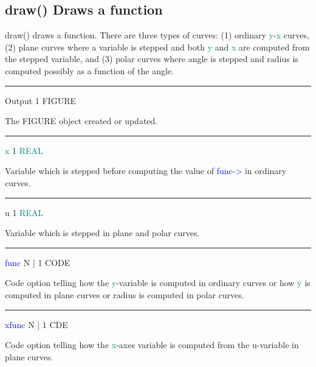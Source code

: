 \subsection{\textcolor{VioletRed}{draw}() Draws a function} 
\label{draw} 
\textcolor{VioletRed}{draw}() draws a function. There are three types of curves: (1) ordinary \textcolor{teal}{y}-\textcolor{teal}{x} curves, (2) plane 
curves where a variable is stepped and both \textcolor{teal}{y} and \textcolor{teal}{x} are computed from the stepped variable, and (3) 
polar curves where angle is stepped and radius is computed possibly as a function of the angle. 
\vspace{0.3cm} 
\hrule 
\vspace{0.3cm} 
\noindent Output  \tabto{3cm}  1 \tabto{5cm}   FIGURE  \tabto{7cm} 
\begin{changemargin}{3cm}{0cm} 
\noindent  The FIGURE object created or updated. 
\end{changemargin} 
\vspace{0.3cm} 
\hrule 
\vspace{0.3cm} 
\noindent \textcolor{teal}{x} \tabto{3cm} 1 \tabto{5cm}  \textcolor{teal}{REAL} \tabto{7cm} 
\begin{changemargin}{3cm}{0cm} 
\noindent Variable which is stepped before computing the value of \textcolor{blue}{func->} in ordinary curves. 
\end{changemargin} 
\vspace{0.3cm} 
\hrule 
\vspace{0.3cm} 
\noindent u \tabto{3cm} 1 \tabto{5cm}  \textcolor{teal}{REAL} \tabto{7cm} 
\begin{changemargin}{3cm}{0cm} 
\noindent Variable which is stepped in plane and polar curves. 
\end{changemargin} 
\vspace{0.3cm} 
\hrule 
\vspace{0.3cm} 
\noindent \textcolor{blue}{func} \tabto{3cm}  N | 1  \tabto{5cm}   CODE  \tabto{7cm} 
\begin{changemargin}{3cm}{0cm} 
\noindent   Code option telling how the \textcolor{teal}{y}-variable is computed in ordinary curves or how 
\textcolor{teal}{y} is computed in plane curves or radius is computed in polar curves. 
\end{changemargin} 
\vspace{0.3cm} 
\hrule 
\vspace{0.3cm} 
\noindent \textcolor{blue}{xfunc} \tabto{3cm}  N | 1  \tabto{5cm}   CDE  \tabto{7cm} 
\begin{changemargin}{3cm}{0cm} 
\noindent   Code option telling how the \textcolor{teal}{x}-axes variable is computed from the u-variable 
in plane curves. 
\end{changemargin} 
